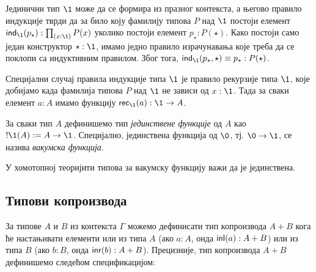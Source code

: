 \documentclass[12pt,oneside]{memoir}
\begin{document}
Јединични тип $\1$ може да се формира из празног контекста, а његово правило индукције тврди да за било коју фамилију типова $P$ над $\1$ постоји елемент $\ind{\1} (p_{\star}) : \prod_{(x : \1)} P (x)$ уколико постоји елемент $p_{\star} : P (\star)$. Како постоји само један конструктор $\star : \1$, имамо једно правило израчунавања које треба да се поклопи са индуктивним правилом. Због тога, $\ind{\1} (p_{\star}, \star) \equiv p_{\star} : P(\star)$.

Специјални случај правила индукције типа $\1$ је правило рекурзије типа $\1$, које добијамо када фамилија типова $P$ над $\1$ не зависи од $x : \1$. Тада за сваки елемент $a : A$ имамо функцију $\rec{\1} (a) : \1 \to A$. 

\begin{definition}
\label{def:unifun}
    За сваки тип $A$ дефинишемо тип \emph{јединствене функције} од $A$ као $!\1(A) := A \to \1$. Специјално, јединствена функција од $\0$, тј. $\0 \to \1$, се назива \emph{вакумска функција}.
\end{definition}

У хомотопној теоријити типова за вакумску функцију важи да је јединствена. 

\subsection{Типови копроизвода}

За типове $A$ и $B$ из контекста $\Gamma$ можемо дефинисати тип копроизвода $A + B$ кога ће настањивати елементи или из типа $A$ (ако $a : A$, онда $\mathsf{inl}(a) : A + B$) или из типа $B$ (ако $b : B$, онда $\mathsf{inr}(b) : A + B$). Прецизније, тип копроизвода $A + B$ дефинишемо следећом спецификацијом:
\end{document}
